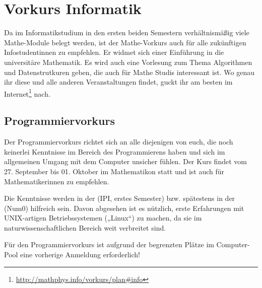 \section{Vorkurs Informatik}
Da im Informatikstudium in den ersten beiden Semestern verhältnismäßig viele Mathe-Module belegt werden, ist der Mathe-Vorkurs auch für alle zukünftigen Infostudentinnen zu empfehlen. Er widmet sich einer Einführung in die universitäre Mathematik.
Es wird auch eine Vorlesung zum Thema Algorithmen und Datenstrutkuren geben, die auch für Mathe Studis interessant ist. Wo genau ihr diese und alle anderen Veranstaltungen findet, guckt ihr am besten im Internet\footnote{\url{http://mathphys.info/vorkurs/plan\#info}} nach.%


\subsection{Programmiervorkurs}
Der Programmiervorkurs richtet sich an alle diejenigen von euch, die noch keinerlei Kenntnisse im Bereich des Programmierens haben und sich im allgemeinen Umgang mit dem Computer unsicher fühlen. Der Kurs findet vom 27. September bis 01. Oktober im Mathematikon statt und ist auch für Mathematikerinnen zu empfehlen.

Die Kenntnisse werden in der  (\gls{IPI}, erstes Semester) bzw. spätestens in der  (\gls{Num0}) hilfreich sein. Davon abgesehen ist es nützlich, erste Erfahrungen mit UNIX-artigen Betriebssystemen („Linux“) zu machen, da sie im naturwissenschaftlichen Bereich weit verbreitet sind.

Für den Programmiervorkurs ist aufgrund der begrenzten Plätze im Computer-Pool eine vorherige Anmeldung erforderlich!

